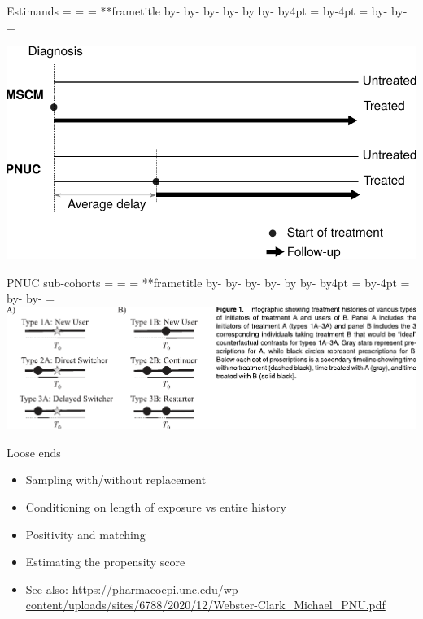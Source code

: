 \documentclass[aspectratio=169,12pt]{beamer} %
\makeatletter
\newif\ifsidebartheme
\newcommand*{\calculatespace}{%
    \contentheight=\paperheight%
    \ifx\beamer@frametitle\@empty%
        \setbox\@tempboxa=\box\voidb@x%
      \else%
        \setbox\@tempboxa=\vbox{%
          \vbox{}%
          {\parskip0pt\usebeamertemplate***{frametitle}}%
        }%
        \ifsidebartheme%
          \advance\contentheight by-1em%
        \fi%
      \fi%
    \advance\contentheight by-\ht\@tempboxa%
    \advance\contentheight by-\dp\@tempboxa%
    \advance\contentheight by-\beamer@frametopskip%
    \ifbeamer@plainframe%
    \contentbottom=0pt%
    \else%
    \advance\contentheight by-\headheight%
    \advance\contentheight by\headdp%
    \advance\contentheight by-\footheight%
    \advance\contentheight by4pt%
    \contentbottom=\footheight%
    \advance\contentbottom by-4pt%
    \fi%
    \contentwidth=\paperwidth%
    \ifbeamer@plainframe%
    \contentleft=0pt%
    \else%
    \advance\contentwidth by-\beamer@rightsidebar%
    \advance\contentwidth by-\beamer@leftsidebar\relax%
    \contentleft=\beamer@leftsidebar%
    \fi%
}
\makeatother
\begin{document}
\begin{frame}{Estimands}
    \calculatespace%
    \begin{center}
	\includegraphics[height=0.95\contentheight]{ref/estimands.pdf}
    \end{center}
\end{frame}

\begin{frame}{PNUC sub-cohorts}
    \calculatespace%
	\includegraphics[width=0.85\contentwidth]{ref/webster-fig1.pdf}
\end{frame}

\begin{frame}{Loose ends}
    \begin{itemize}
	\item Sampling with/without replacement
	\item Conditioning on length of exposure vs entire history
	\item Positivity and matching
	\item Estimating the propensity score
	\item See also: \url{https://pharmacoepi.unc.edu/wp-content/uploads/sites/6788/2020/12/Webster-Clark_Michael_PNU.pdf}
    \end{itemize}
\end{frame}

\end{document}
